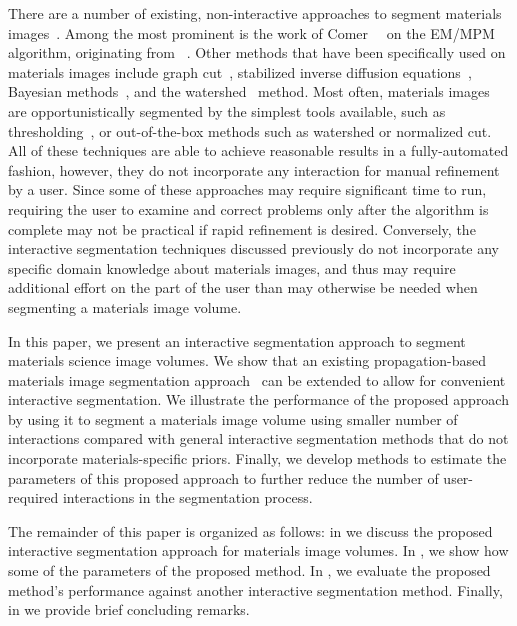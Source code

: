 \documentclass[]{spie}  %
\begin{document}
There are a number of existing, non-interactive approaches to segment
materials images~\cite{chuang:08, simmons:09}.  Among the most
prominent is the work of Comer~\etal~\cite{comer:94, comer:00} on the
EM/MPM algorithm, originating from~\cite{marroquin:87} .  Other
methods that have been specifically used on materials images include
graph cut~\cite{landis:11, waggoner:11}, stabilized inverse diffusion
equations~\cite{huffman:08}, Bayesian methods~\cite{comer:11,
  simmons:08}, and the watershed~\cite{liq:07} method.  Most often,
materials images are opportunistically segmented by the simplest tools
available, such as thresholding~\cite{gonzalez:08,shapiro:01}, or
out-of-the-box methods such as watershed or normalized cut.  All of
these techniques are able to achieve reasonable results in a
fully-automated fashion, however, they do not incorporate any
interaction for manual refinement by a user.  Since some of these
approaches may require significant time to run, requiring the user to
examine and correct problems only after the algorithm is complete may
not be practical if rapid refinement is desired.  Conversely, the
interactive segmentation techniques discussed previously do not
incorporate any specific domain knowledge about materials images, and
thus may require additional effort on the part of the user than may
otherwise be needed when segmenting a materials image volume.

In this paper, we present an interactive segmentation approach to
segment materials science image volumes.  We show that an existing
propagation-based materials image segmentation
approach~\cite{waggoner:11} can be extended to allow for convenient
interactive segmentation.  We illustrate the performance of the
proposed approach by using it to segment a materials image volume
using smaller number of interactions compared with general interactive
segmentation methods that do not incorporate materials-specific
priors.  Finally, we develop methods to estimate the parameters of
this proposed approach to further reduce the number of user-required
interactions in the segmentation process.

The remainder of this paper is organized as follows: in
 we discuss the proposed interactive segmentation
approach for materials image volumes. In , we show how
some of the parameters of the proposed method.  In , we
evaluate the proposed method's performance against another interactive
segmentation method.  Finally, in  we provide brief
concluding remarks.
\end{document}
